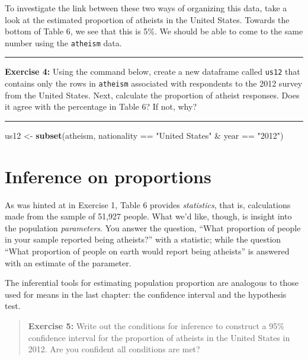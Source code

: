 \documentclass[]{book}
\newenvironment{Shaded}{\begin{snugshade}}{\end{snugshade}}
\newcommand{\KeywordTok}[1]{\textcolor[rgb]{0.13,0.29,0.53}{\textbf{{#1}}}}
\newcommand{\StringTok}[1]{\textcolor[rgb]{0.31,0.60,0.02}{{#1}}}
\newcommand{\NormalTok}[1]{{#1}}
\theoremstyle{definition}
\theoremstyle{definition}
\theoremstyle{definition}
\theoremstyle{remark}
\begin{document}
To investigate the link between these two ways of organizing this data,
take a look at the estimated proportion of atheists in the United
States. Towards the bottom of Table 6, we see that this is 5\%. We
should be able to come to the same number using the \texttt{atheism}
data.

\begin{center}\rule{0.5\linewidth}{\linethickness}\end{center}

\textbf{Exercise 4:} Using the command below, create a new dataframe
called \texttt{us12} that contains only the rows in \texttt{atheism}
associated with respondents to the 2012 survey from the United States.
Next, calculate the proportion of atheist responses. Does it agree with
the percentage in Table 6? If not, why?

\begin{center}\rule{0.5\linewidth}{\linethickness}\end{center}

\begin{Shaded}
\begin{Highlighting}[]
\NormalTok{us12 <-}\StringTok{ }\KeywordTok{subset}\NormalTok{(atheism, nationality ==}\StringTok{ "United States"} \NormalTok{&}\StringTok{ }\NormalTok{year ==}\StringTok{ "2012"}\NormalTok{)}
\end{Highlighting}
\end{Shaded}

\section{Inference on proportions}\label{inference-on-proportions}

As was hinted at in Exercise 1, Table 6 provides \emph{statistics}, that
is, calculations made from the sample of 51,927 people. What we'd like,
though, is insight into the population \emph{parameters}. You answer the
question, ``What proportion of people in your sample reported being
atheists?'' with a statistic; while the question ``What proportion of
people on earth would report being atheists'' is answered with an
estimate of the parameter.

The inferential tools for estimating population proportion are analogous
to those used for means in the last chapter: the confidence interval and
the hypothesis test.

\begin{quote}
\textbf{Exercise 5:} Write out the conditions for inference to construct
a 95\% confidence interval for the proportion of atheists in the United
States in 2012. Are you confident all conditions are met?
\end{quote}
\end{document}
